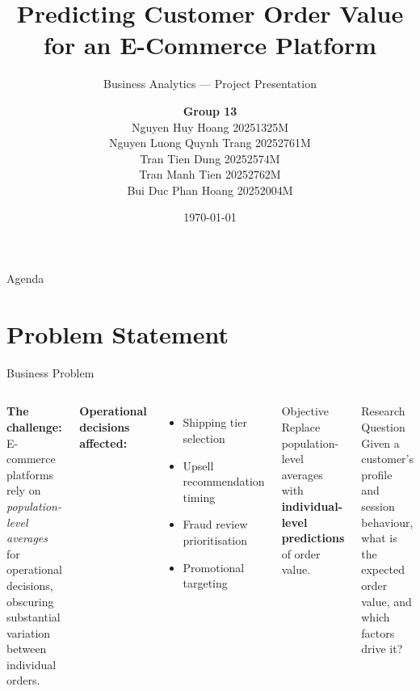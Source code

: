 \documentclass[aspectratio=169,10pt]{beamer}
\title{\textbf{Predicting Customer Order Value}\\[6pt]
       \large for an E-Commerce Platform}
\subtitle{Business Analytics --- Project Presentation}
\author{
  \textbf{Group 13}\\[4pt]
  \small Nguyen Huy Hoang 20251325M\\
  \small Nguyen Luong Quynh Trang 20252761M\\
  \small Tran Tien Dung 20252574M\\
  \small Tran Manh Tien 20252762M\\
  \small Bui Duc Phan Hoang 20252004M
}
\institute{Brazilian E-Commerce Public Dataset (Olist)}
\date{\today}
\begin{document}
\begin{frame}
  \titlepage
\end{frame}

\begin{frame}{Agenda}
  \tableofcontents
\end{frame}

\section{Problem Statement}

\begin{frame}{Business Problem}
  \begin{columns}[T]
    \textbf{The challenge:} E-commerce platforms rely on
    \emph{population-level averages} for operational decisions, obscuring
    substantial variation between individual orders.

    \vspace{8pt}
    \textbf{Operational decisions affected:}
    \begin{itemize}
      \item Shipping tier selection
      \item Upsell recommendation timing
      \item Fraud review prioritisation
      \item Promotional targeting
    \end{itemize}

    \begin{block}{Objective}
      Replace population-level averages with
      \textbf{individual-level predictions} of order value.
    \end{block}
    \vspace{4pt}
    \begin{alertblock}{Research Question}
      Given a customer's profile and session behaviour, what is the
      expected order value, and which factors drive it?
    \end{alertblock}
  \end{columns}
\end{frame}
\end{document}
